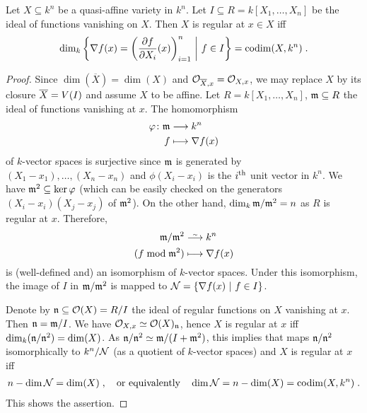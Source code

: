 \documentclass[a4paper,parskip=half,numbers=enddot, DIV=12, headheight=30pt]{scrreprt}
\begin{document}
\begin{prop}
    Let $X\subseteq k^n$ be  a quasi-affine variety in $k^n$. Let $I\subseteq R=k[X_1,\ldots,X_n]$ be the ideal of functions vanishing on $X$. Then $X$ is regular at $x\in X$ iff 
    \begin{align*}
        \dim_k \left\{\nabla f(x) = \left(\frac{\partial f}{\partial X_i}(x)\right)_{i=1}^n \ \middle|\  f\in I\right\} = \operatorname{codim}(X,k^n)\;.
    \end{align*}
\end{prop}
\begin{proof}
    Since $\dim (\overline{X}) = \dim (X)$ and $\mathcal{O}_{\overline{X},x} = \mathcal{O}_{X,x}$, we may replace $X$ by its closure $\overline{X}=V(I)$ and assume $X$ to be affine. Let $R=k[X_1,\ldots,X_n]$, $\mathfrak{m}\subseteq R$ the ideal of functions vanishing at $x$. The homomorphism
    \begin{align*}
    	\phi\colon\mm&\morphism k^n\\
    	f&\longmapsto\nabla f(x)
    \end{align*}
    of $k$-vector spaces is surjective since $\mathfrak{m}$ is generated by $(X_1-x_1),\ldots,(X_n-x_n)$ and $\phi(X_i-x_i)$ is the $i^{\text{th}}$ unit vector in $k^n$. We have $\mathfrak{m}^2\subseteq\ker\varphi$ (which can be easily checked on the generators $(X_i-x_i)(X_j-x_j)$ of $\mathfrak{m}^2$). On the other hand, $\dim_k\mathfrak{m}/\mathfrak{m}^2=n$ as $R$ is regular at $x$. Therefore,
    \begin{align}\lbl{eq:modToNabla}
	    \begin{split}
		    \mm/\mm^2 &\isomorphism k^n\\
		    (f\bmod \mm^2)&\longmapsto \nabla f(x)
	    \end{split}
    \end{align}
    is (well-defined and) an isomorphism of $k$-vector spaces. Under this isomorphism, the image of $I$ in $\mathfrak{m}/\mathfrak{m}^2$ is mapped to $\mathcal{N}=\left\{\nabla f(x) \ \middle|\  f\in I\right\}$.
    
     Denote by $\mathfrak{n}\subseteq \mathcal{O}(X)=R/I$ the ideal of regular functions on $X$ vanishing at $x$. Then $\mathfrak{n} = \mathfrak{m}/I$. We have $\mathcal{O}_{X,x} \simeq \mathcal{O}(X)_{\mathfrak{n}}$, hence $X$ is regular at $x$ iff $\dim_k(\mathfrak{n}/\mathfrak{n}^2) = \dim (X)$. As $\mathfrak{n}/\mathfrak{n}^2\simeq \mathfrak{m}/(I+\mathfrak{m}^2)$, this implies that  maps $\mathfrak{n}/\mathfrak{n}^2$ isomorphically to $k^n/\mathcal{N}$ (as a quotient of $k$-vector spaces) and $X$ is regular at $x$ iff 
     \begin{align*}
     	n-\dim\mathcal{N} = \dim (X)\;,\quad\text{or equivalently}\quad\dim \mathcal{N} =n-\dim (X) = \operatorname{codim}(X,k^n)\;.
     \end{align*}
     This shows the assertion.
\end{proof}
\end{document}
